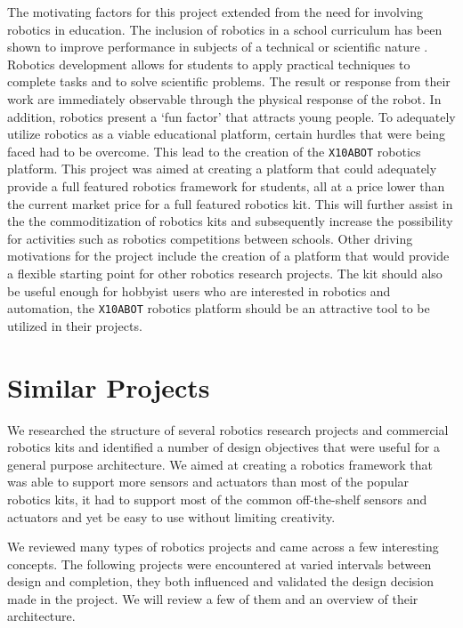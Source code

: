 The motivating factors for this project extended from the need for involving
robotics in education. The  inclusion of robotics in a school curriculum has been
shown to improve performance in subjects of a technical or scientific nature \cite{rbot}. 
Robotics development
allows for students to apply practical techniques to complete tasks and 
to solve scientific problems. The result or response from their work are
immediately observable through the physical response of the robot. In addition,
robotics  present a `fun factor' that attracts young people.
To adequately utilize robotics as a viable educational platform, certain hurdles 
that were being faced had to be overcome. This lead to the creation of the \texttt{X10ABOT} robotics
platform. This project was aimed at creating a platform that could 
adequately provide a full featured robotics framework for students, all at a
price lower than the current market price for a full featured robotics kit.
This will further assist in the the commoditization of robotics kits and subsequently
increase the possibility for activities such as robotics competitions between schools.
Other driving motivations for the project include the creation of a platform that
would provide a flexible starting point for other robotics research projects. The kit
should also be useful enough for hobbyist users who are interested in robotics
and automation, the \texttt{X10ABOT} robotics platform should be an attractive tool to be utilized in their projects.

\section{Similar Projects} %
\label{sec:similar}
We researched the structure of several robotics research projects and commercial robotics kits and identified a number of design objectives that were useful for a general purpose architecture. We aimed at creating a robotics framework that was able to support more sensors and actuators than most of the popular robotics kits, it had to support most of the common off-the-shelf sensors and actuators and yet be easy to use without limiting creativity. 

We reviewed many types of robotics projects and came across a few interesting concepts. The following projects were encountered at varied intervals between design and completion, they both influenced and validated the design decision made in the \xten project. We will review a few of them and an overview of their architecture. 

